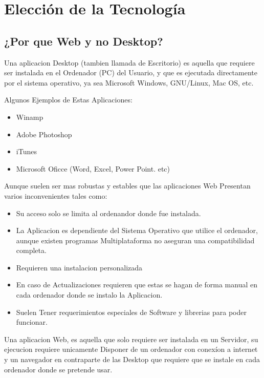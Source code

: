 \chapter{Elección de la Tecnología}

\section{¿Por que Web y no Desktop?}

Una aplicacion Desktop (tambien llamada de Escritorio) es aquella que requiere
ser instalada en el Ordenador (PC) del Usuario, y que es ejecutada directamente
por el sistema operativo, ya sea Microsoft Windows, GNU/Linux, Mac OS, etc.

Algunos Ejemplos de Estas Aplicaciones:

\begin{itemize}
    \item Winamp
    \item Adobe Photoshop
    \item iTunes
    \item Microsoft Oficce (Word, Excel, Power Point. etc)
\end{itemize}

Aunque suelen ser mas robustas y estables que las aplicaciones Web Presentan
varios inconvenientes tales como:

\begin{itemize}
    \item Su acceso solo se limita al ordenandor donde fue instalada.
    \item La Aplicacion es dependiente del Sistema Operativo que utilice el ordenador, aunque
        existen programas Multiplataforma no aseguran una compatibilidad completa.
    \item Requieren una instalacion personalizada
    \item En caso de Actualizaciones requieren que estas se hagan de forma manual en cada ordenador
        donde se instalo la Aplicacion.
    \item Suelen Tener requerimientos especiales de Software y librerias para poder funcionar.
\end{itemize}


Una aplicacion Web, es aquella que solo requiere ser instalada en un Servidor, su 
ejecucion requiere unicamente Disponer de un ordenador con conexíon a internet
y un navegador en contraparte de las Desktop que requiere que se instale en cada 
ordenador donde se pretende usar.

